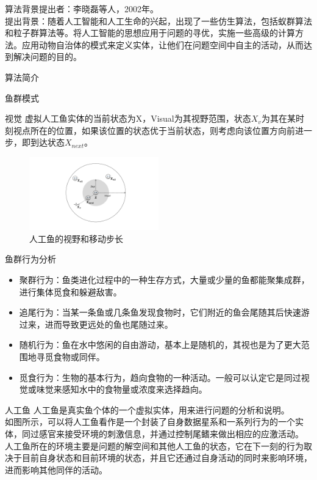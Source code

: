 \documentclass[UTF8]{ctexart}
\begin{document}
\newpage
\setcounter{page}{1}
\begin{section}
	{算法背景}提出者：李晓磊等人，2002年。\\提出背景：随着人工智能和人工生命的兴起，出现了一些仿生算法，包括蚁群算法和粒子群算法等。将人工智能的思想应用于问题的寻优，实施一些高级的计算方法。应用动物自治体的模式来定义实体，让他们在问题空间中自主的活动，从而达到解决问题的目的。
\end{section}
\begin{section}
{算法简介}
	\begin{subsection}
	{鱼群模式}
		\begin{subsubsection}
		{视觉}	虚拟人工鱼实体的当前状态为X，Visual为其视野范围，状态$X_v$为其在某时刻视点所在的位置，如果该位置的状态优于当前状态，则考虑向该位置方向前进一步，即到达状态$X_{next}。$
		\begin{figure}[htbp]
			\centering
			\includegraphics[width=0.5\textwidth]{../../pic/fish1.pdf}
			\caption{人工鱼的视野和移动步长}
		\end{figure}
		\end{subsubsection}
		\begin{subsubsection}
		{鱼群行为分析}
		\begin{itemize}
			\item{聚群行为：鱼类进化过程中的一种生存方式，大量或少量的鱼都能聚集成群，进行集体觅食和躲避敌害。}
			\item{追尾行为：当某一条鱼或几条鱼发现食物时，它们附近的鱼会尾随其后快速游过来，进而导致更远处的鱼也尾随过来。}
			\item{随机行为：鱼在水中悠闲的自由游动，基本上是随机的，其视也是为了更大范围地寻觅食物或同伴。}
			\item{觅食行为：生物的基本行为，趋向食物的一种活动。一般可以认定它是同过视觉或味觉来感知水中的食物量或浓度来选择趋向。}
		\end{itemize}
		\end{subsubsection}
		\begin{subsubsection}
		{人工鱼}		人工鱼是真实鱼个体的一个虚拟实体，用来进行问题的分析和说明。\\如图所示，可以将人工鱼看作是一个封装了自身数据星系和一系列行为的一个实体，同过感官来接受环境的刺激信息，并通过控制尾鳍来做出相应的应激活动。\\人工鱼所在的环境主要是问题的解空间和其他人工鱼的状态，它在下一刻的行为取决于目前自身状态和目前环境的状态，并且它还通过自身活动的同时来影响环境，进而影响其他同伴的活动。

\end{subsubsection}
\end{subsection}
\end{section}
\end{document}
